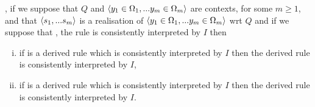 \begin{lemma}
\IfIpartialmappingUtoC,
if we suppose that $Q$ and $\langle y_1 \in \Omega_1,... y_{m} \in \Omega_{m}\rangle$ are contexts, for some $m \geq 1$, 
and that $\langle s_1,...s_{m}\rangle$ is a realisation of $\langle y_1 \in \Omega_1,... y_{m} \in \Omega_{m}\rangle$ wrt $Q$ and
if we suppose that \foreachj, the rule  is consistently interpreted by $I$ then
\begin{enumerate}[(i)]
\item if \ZOmega is a derived rule which is consistently interpreted by $I$
then the derived rule \ZOmegaSUBsmFORym is consistently interpreted by $I$,
\item if \ZsOmega is a derived rule which is consistently interpreted by $I$
then the derived rule \ZsOmegaSUBsmFORym is consistently interpreted by $I$.
\end{enumerate}
\end{lemma}
